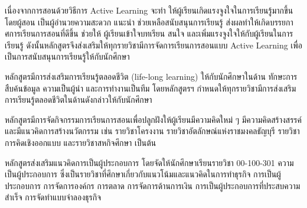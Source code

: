 {

เนื่องจากการสอนด้วยวิธีการ Active Learning จะทำ ให้ผู้เรียนเกิดแรงจูงใจในการเรียนรู้มากขึ้น  โดยผู้สอน
เป็นผู้อำนวยความสะดวก แนะนำ ช่วยเหลือสนับสนุนการเรียนรู้ ส่งผลทำให้เกิดบรรยกาศการเรียนการสอนที่ดีขึ้น ช่วยให้
ผู้เรียนเข้าใจบทเรียน สนใจ และเพิ่มแรงจูงใจให้กับผู้เรียนในการเรียนรู้ 
ดังนั้นหลักสูตรจึงส่งเสริมให้ทุกรายวิชามีการจัดการเรียนการสอนแบบ Active Learning เพื่อเป็นการสนับสนุนการเรียนรู้ให้กับนักศึกษา

หลักสูตรมีการส่งเสริมการเรียนรู้ตลอดชีวิต (life-long learning) ให้กับนักศึกษาในด้าน ทักษะการสืบค้นข้อมูล ความเป็นผู้นำ และการทำงานเป็นทีม โดยหลักสูตรฯ กำหนดให้ทุกรายวิชามีการส่งเสริมการเรียนรู้ตลอดชีวิตในด้านดังกล่าวให้กับนักศึกษา





\begin{doclist}
\end{doclist}



หลักสูตรมีการจัดกิจกรรมการเรียนการสอนเพื่อปลูกฝังให้ผู้เรียนมีความคิดใหม่ ๆ มีความคิดสร้างสรรค์ และมีแนวคิดการสร้างนวัตกรรม เช่น รายวิชาโครงงาน รายวิชาอัตลักษณ์แห่งราชมงคลธัญบุรี รายวิชา การคิดเชิงออกแบบ และรายวิชาสหกิจศึกษา เป็นต้น

หลักสูตรส่งเสริมแนวคิดการเป็นผู้ประกอบการ โดยจัดให้นักศึกษาเรียนรายวิชา 00-100-301 ความเป็นผู้ประกอบการ ซึ่งเป็นรายวิชาที่ศึกษาเกี่ยวกับแนวโน้มและแนวคิดในการทำธุรกิจ การเป็นผู้ประกอบการ การจัดการองค์กร การตลาด การจัดการด้านการเงิน การเป็นผู้ประกอบการที่ประสบความสำเร็จ การจัดทำแบบจำลองธุรกิจ
 
\begin{doclist}
\end{doclist}


}
